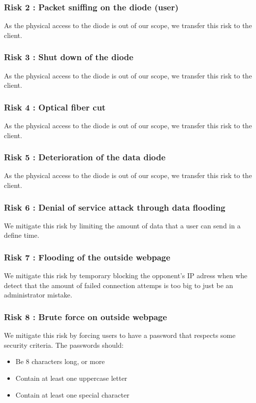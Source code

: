 \documentclass[a4paper,11pt]{article}
\begin{document}
\subsubsection{Risk 2 : Packet sniffing on the diode (user) }
As the physical access to the diode is out of our scope, we transfer this risk to the client.
\subsubsection{Risk 3 : Shut down of the diode}
As the physical access to the diode is out of our scope, we transfer this risk to the client.
\subsubsection{Risk 4 : Optical fiber cut}
As the physical access to the diode is out of our scope, we transfer this risk to the client.
\subsubsection{Risk 5 : Deterioration of the data diode}
As the physical access to the diode is out of our scope, we transfer this risk to the client.
\subsubsection{Risk 6 : Denial of service attack through data flooding}
We mitigate this risk by limiting the amount of data that a user can send in a define time.
\subsubsection{Risk 7 : Flooding of the outside webpage}
We mitigate this risk by temporary blocking the opponent's IP adress when whe detect that the amount of failed connection attemps is too big to just be an administrator mistake.
\subsubsection{Risk 8 : Brute force on outside webpage}
We mitigate this risk by forcing users to have a password that respects some security criteria. The passwords should:

\begin{itemize}
	\item{Be 8 characters long, or more}
	\item{Contain at least one uppercase letter}
	\item{Contain at least one special character}
\end{itemize}
\end{document}
